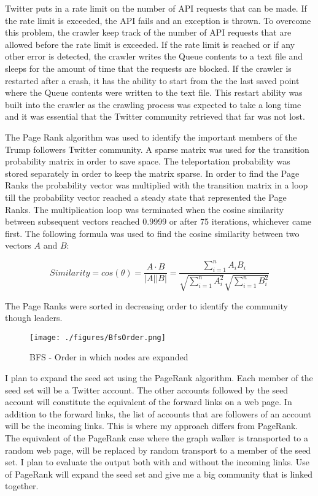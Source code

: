 \documentclass{sig-alternate-05-2015}
\begin{document}
Twitter puts in a rate limit on the number of API requests that can be made. If the rate limit is exceeded, the API fails and an exception is thrown. To overcome this problem, the crawler keep track of the number of API requests that are allowed before the rate limit is exceeded. If the rate limit is reached or if any other error is detected, the crawler writes the Queue contents to a text file and sleeps for the amount of time that the requests are blocked. If the crawler is restarted after a crash, it has the ability to start from the the last saved point where the Queue contents were written to the text file. This restart ability was built into the crawler as the crawling process was expected to take a long time and it was essential that the Twitter community retrieved that far was not lost.

The Page Rank algorithm\cite{IRB} was used to identify the important members of the Trump followers Twitter community. A sparse matrix was used for the transition probability matrix in order to save space. The teleportation probability was stored separately in order to keep the matrix sparse. In order to find the Page Ranks the probability vector was multiplied with the transition matrix in a loop till the probability vector reached a steady state that represented the Page Ranks. The multiplication loop was terminated when the cosine similarity between subsequent vectors reached 0.9999 or after 75 iterations, whichever came first. The following formula was used to find the cosine similarity between two vectors $A$ and $B$\cite{CosineSimilarity}:

\begin{displaymath}
Similarity = cos(\theta) = \frac{A \cdot B}{\left | A \right | \left | B \right |} = \frac{\sum\limits_{i=1}^{n} A_i B_i}{\sqrt{\sum\limits_{i=1}^{n} A_i^2 } \sqrt{\sum\limits_{i=1}^{n} B_i^2 }}
\end{displaymath}

The Page Ranks were sorted in decreasing order to identify the community though leaders.
\begin{figure}[!t]
\centering
\texttt{[image: ./figures/BfsOrder.png]}
\caption{BFS\cite{BFS} - Order in which nodes are expanded}
\label{BfsOrder}
\end{figure}
I plan to expand the seed set using the PageRank algorithm. Each member of the seed set will be a Twitter account. The other accounts followed by the seed account will constitute the equivalent of the forward links on a web page. In addition to the forward links, the list of accounts that are followers of an account will be the incoming links. This is where my approach differs from PageRank. The equivalent of the PageRank case where the graph walker is transported to a random web page, will be replaced by random transport to a member of the seed set. I plan to evaluate the output both with and without the incoming links. Use of PageRank will expand the seed set and give me a big community that is linked together. 
\end{document}
